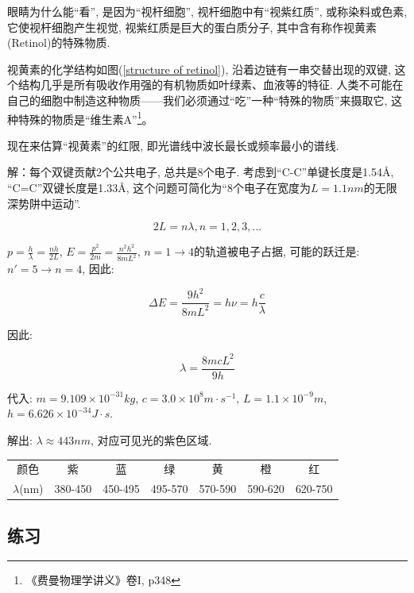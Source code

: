 眼睛为什么能``看'', 是因为``视杆细胞'', 视杆细胞中有``视紫红质'',
或称染料或色素, 它使视杆细胞产生视觉, 视紫红质是巨大的蛋白质分子,
其中含有称作视黄素(Retinol)的特殊物质.

视黄素的化学结构如图(\ref{structure of retinol}),
沿着边链有一串交替出现的双键,
这个结构几乎是所有吸收作用强的有机物质如叶绿素、血液等的特征.
人类不可能在自己的细胞中制造这种物质——我们必须通过``吃''一种``特殊的物质''来摄取它,
这种特殊的物质是``维生素A''\footnote{《费曼物理学讲义》卷I, p348}。

现在来估算``视黄素''的红限, 即光谱线中波长最长或频率最小的谱线.

解：每个双键贡献2个公共电子, 总共是8个电子.
考虑到``C-C''单键长度是1.54{\AA}, ``C=C''双键长度是1.33{\AA},
这个问题可简化为``8个电子在宽度为$L=1.1nm$的无限深势阱中运动''.

\begin{equation*}
    2L = n \lambda , n=1,2,3,...
\end{equation*}

$p = \frac{h}{\lambda} = \frac{nh}{2L}$, $E =
\frac{p^2}{2m}=\frac{n^2h^2}{8mL^2}$, $n=1 \to 4$的轨道被电子占据,
可能的跃迁是: $n'=5 \to n=4$, 因此:


\begin{equation*}
\Delta E = \frac{9 h^2}{8 m L^2} = h \nu = h \frac{c}{\lambda}
\end{equation*}

因此:

\begin{equation*}
    \lambda = \frac{8mcL^2}{9h}
\end{equation*}

代入: $m=9.109 \times 10^{-31} kg$, $c=3.0\times 10^8 m \cdot
s^{-1}$, $L = 1.1 \times 10^{-9}m$, $h=6.626 \times 10^{-34} J \cdot
s$.

解出: $\lambda \approx 443 nm$, 对应可见光的紫色区域.


\begin{center}
\begin{tabular}{|c|c|c|c|c|c|c|}
  \hline
  颜色 & 紫 & 蓝 & 绿 & 黄 & 橙 & 红 \\
  $\lambda$(nm) & 380-450 & 450-495 & 495-570 & 570-590 & 590-620 & 620-750 \\
  \hline
\end{tabular}
\end{center}


\subsection*{练习}

